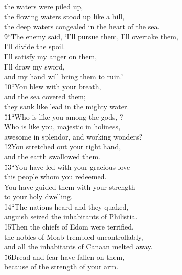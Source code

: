 \begin{poetry}
\poemll    the waters were piled up, \\
\poeml the flowing waters stood up like a hill, \\
\poemll    the deep waters congealed in the heart of the sea. \\
\poeml \v{9}``The enemy said, `I'll pursue them, I'll overtake them, \\
\poemll    I'll divide the spoil. \\
\poeml I'll satisfy my anger on them, \\
\poemll    I'll draw my sword, \\
\poemlll       and my hand will bring them to ruin.' \\
\poeml \v{10}``You blew with your breath, \\
\poemll    and the sea covered them; \\
\poemlll       they sank like lead in the mighty water. \\
\poeml \v{11}``Who is like you among the gods, ? \\
\poemll    Who is like you, majestic in holiness, \\
\poemlll       awesome in splendor, and working wonders? \\
\poeml \v{12}You stretched out your right hand, \\
\poemll    and the earth swallowed them. \\
\poeml \v{13}``You have led with your gracious love \\
\poemll    this people whom you redeemed. \\
\poeml You have guided them with your strength \\
\poemll    to your holy dwelling. \\
\poeml \v{14}``The nations heard and they quaked, \\
\poemll    anguish seized the inhabitants of Philistia. \\
\poeml \v{15}Then the chiefs of Edom were terrified, \\
\poemll    the nobles of Moab trembled uncontrollably, \\
\poemlll       and all the inhabitants of Canaan melted away. \\
\poeml \v{16}Dread and fear have fallen on them, \\
\poemll    because of the strength of your arm. \\

\end{poetry}
